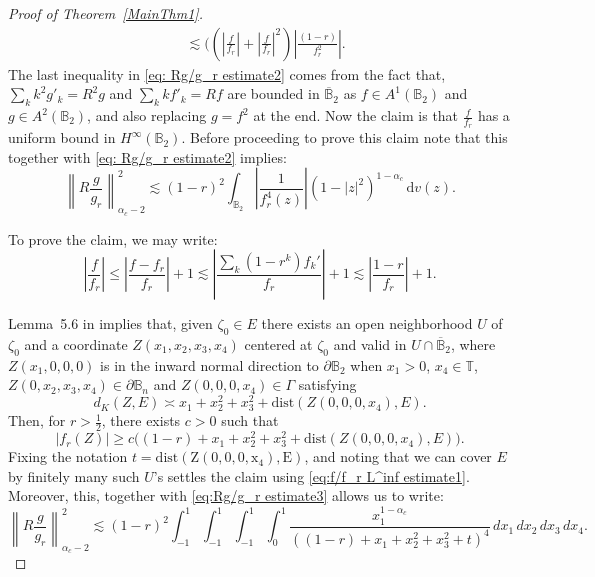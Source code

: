 \documentclass[a4paper,12pt]{amsart}
\theoremstyle{definition}
\theoremstyle{remark}
\def\B{\mathbb{B}}
\def\Bn{\mathbb{B}_n}
\begin{document}
\begin{proof} [Proof of Theorem~\ref{MainThm1}]
\begin{equation}
\begin{aligned}
        &\lesssim (\left(\left|\frac{f}{f_r}\right| + \left|\frac{f}{f_r}\right|^2 \right)      \left|\frac{(1-r)}{f_r^2} \right|.
    \end{aligned}
    \end{equation}
    The last inequality in \eqref{eq: Rg/g_r estimate2} comes from the fact that, $\sum_k k^2 g'_k = R^2g$ and $\sum_k k f'_k = Rf$ are bounded in $\overline{\B}_2$ as $f \in A^1(\B_2)$ and $g \in A^2(\B_2)$, and also replacing $g = f^2$ at the end. Now the claim is that $\frac{f}{f_r} $ has a uniform bound in $H^{\infty}(\B_2)$. Before proceeding to prove this claim note that this together with \eqref{eq: Rg/g_r estimate2} implies:
    \begin{equation} \label{eq:Rg/g_r estimate3}
        \left\| R \frac{g}{g_r} \right\|_{\alpha_c - 2}^2 \lesssim (1-r)^2 \int_{\B_2} \left| \frac{1}{f_r^4(z)}  \right| (1-|z|^2)^{1-\alpha_c}\, \mathrm{d}v(z).
    \end{equation}
    
    To prove the claim, we may write:
    \begin{equation} \label{eq:f/f_r L^inf estimate1}
        \left| \frac{f}{f_r} \right| \leq \left| \frac{f-f_r}{f_r} \right| + 1 \lesssim \left| \frac{\sum_{k} (1-r^k)f_k'}{f_r}\right| +1 \lesssim \left| \frac{1-r}{f_r} \right| +1.
    \end{equation}
    
    Lemma~{5.6} in \cite{Bruna1986} implies that, given $\zeta_0 \in E$ there exists an open neighborhood $U$ of $\zeta_0$ and a coordinate $Z(x_1,x_2,x_3,x_4)$ centered at $\zeta_0$ and valid in $U \cap \overline{\B}_2$, where $Z(x_1,0,0,0)$ is in the inward normal direction to $\partial \B_2$ when $x_1 > 0$, $x_4 \in \mathbb{T}$, $Z(0,x_2,x_3,x_4) \in \partial \Bn$ and $Z(0,0,0,x_4) \in \Gamma$ satisfying
    \begin{equation}
        d_K(Z,E) \asymp x_1 + x_2^2 + x_3^2 + \mathrm{dist}(Z(0,0,0,x_4),E).
    \end{equation}
    Then, for $r > \tfrac{1}{2}$, there exists $c > 0$ such that
    \begin{equation} \label{f/fr eq2}
        |f_r(Z)| \geq c \Big( (1-r) + x_1 + x_2^2 + x_3^2 + \mathrm{dist}(Z(0,0,0,x_4),E) \Big).
    \end{equation}
    Fixing the notation $t = \mathrm{dist(Z(0,0,0,x_4),E)}$, and noting that we can cover $E$ by finitely many such $U$'s settles the claim using \eqref{eq:f/f_r L^inf estimate1}. Moreover, this, together with \eqref{eq:Rg/g_r estimate3} allows us to write: 
    \begin{equation} \label{f/fr eq3}
        \left\| R \frac{g}{g_r} \right\|^2_{\alpha_c - 2}
        \lesssim (1 - r)^2 \int_{-1}^1 \int_{-1}^1 \int_{-1}^1 \int_0^1 
        \frac{x_1^{1 - \alpha_c}}{((1-r) + x_1 + x_2^2 + x_3^2 + t)^{4}} \, dx_1\, dx_2\, dx_3\, dx_4.
    \end{equation}


\end{proof}
\end{document}
